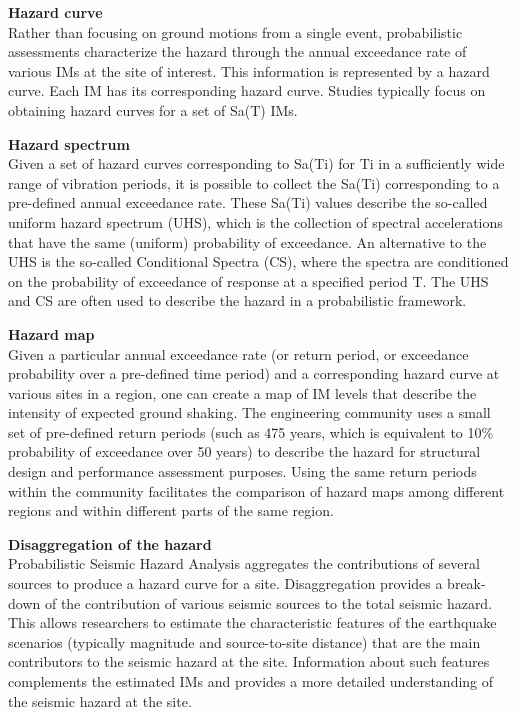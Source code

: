 \noindent\textbf{Hazard curve } \\Rather than focusing on ground motions from a single event, probabilistic assessments characterize the hazard through the annual exceedance rate of various IMs at the site of interest. This information is represented by a hazard curve. Each IM has its corresponding hazard curve. Studies typically focus on obtaining hazard curves for a set of Sa(T) IMs. 
\newline

\noindent\textbf{Hazard spectrum} \\Given a set of hazard curves corresponding to Sa(Ti) for Ti in a sufficiently wide range of vibration periods, it is possible to collect the Sa(Ti) corresponding to a pre-defined annual exceedance rate. These Sa(Ti) values describe the so-called uniform hazard spectrum (UHS), which is the collection of spectral accelerations that have the same (uniform) probability of exceedance. An alternative to the UHS is the so-called Conditional Spectra (CS), where the spectra are conditioned on the probability of exceedance of response at a specified period T. The UHS and CS are often used to describe the hazard in a probabilistic framework.
\newline

\noindent\textbf{Hazard map} \\Given a particular annual exceedance rate (or return period, or exceedance probability over a pre-defined time period) and a corresponding hazard curve at various sites in a region, one can create a map of IM levels that describe the intensity of expected ground shaking. The engineering community uses a small set of pre-defined return periods (such as 475 years, which is equivalent to 10\% probability of exceedance over 50 years) to describe the hazard for structural design and performance assessment purposes. Using the same return periods within the community facilitates the comparison of hazard maps among different regions and within different parts of the same region.
\newline

\noindent\textbf{Disaggregation of the hazard } \\Probabilistic Seismic Hazard Analysis aggregates the contributions of several sources to produce a hazard curve for a site. Disaggregation provides a break-down of the contribution of various seismic sources to the total seismic hazard. This allows researchers to estimate the characteristic features of the earthquake scenarios (typically magnitude and source-to-site distance) that are the main contributors to the seismic hazard at the site. Information about such features complements the estimated IMs and provides a more detailed understanding of the seismic hazard at the site.

